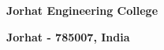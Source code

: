 \begin{titlepage}
\begin{center}
    {\large \textbf{Jorhat Engineering College}\par}
    \vspace{0.4cm}
    {\large \textbf{Jorhat - 785007, India}}
    \vspace{0.4cm}
    
\end{center}
\end{titlepage}